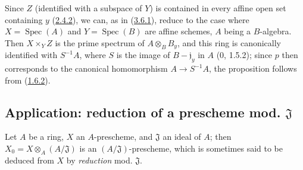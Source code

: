 Since $Z$ (identified with a subspace of $Y$) is contained in every affine
open set containing $y$ (\hyperref[I.2.4.2]{2.4.2}), we can, as in
(\hyperref[I.3.6.1]{3.6.1}), reduce to the case where
$X=\operatorname{Spec}(A)$ and $Y=\operatorname{Spec}(B)$ are affine schemes,
$A$ being a $B$-algebra. Then $X\times_Y Z$ is the prime spectrum
of $A\otimes_B B_y$, and this ring is canonically identified with $S^{-1}A$,
where $S$ is the image of $B-\mathfrak{j}_y$ in $A$ (0, 1.5.2); since $p$
then corresponds to the canonical homomorphism $A\to S^{-1}A$, the proposition
follows from (\hyperref[I.1.6.2]{1.6.2}).

\subsection{Application: reduction of a prescheme mod.
\texorpdfstring{$\mathfrak{J}$\protect\footnotemark}{J}}
\label{subsection:I.3.7}
\label{I.3.7}

\begin{env}[3.7.1]
\label{I.3.7.1}
Let $A$ be a ring, $X$ an $A$-prescheme, and $\mathfrak{J}$ an ideal of $A$;
then $X_0=X\otimes_A(A/\mathfrak{J})$ is an
$(A/\mathfrak{J})$-prescheme, which is sometimes said to be deduced from $X$ by
\emph{reduction} mod. $\mathfrak{J}$.
\end{env}

